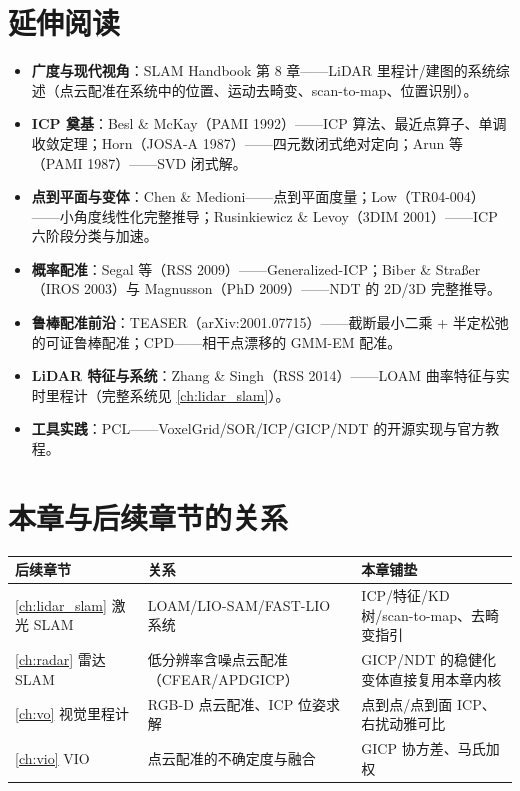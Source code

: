 \section*{延伸阅读}
\begin{itemize}
  \item \textbf{广度与现代视角}：SLAM Handbook\cite{carlone2026handbook} 第 8 章——LiDAR 里程计/建图的系统综述（点云配准在系统中的位置、运动去畸变、scan-to-map、位置识别）。
  \item \textbf{ICP 奠基}：Besl \& McKay\cite{besl1992icp}（PAMI 1992）——ICP 算法、最近点算子、单调收敛定理；Horn\cite{horn1987absolute}（JOSA-A 1987）——四元数闭式绝对定向；Arun 等\cite{arun1987leastsquares}（PAMI 1987）——SVD 闭式解。
  \item \textbf{点到平面与变体}：Chen \& Medioni\cite{chen1992pointplane}——点到平面度量；Low\cite{low2004p2plane}（TR04-004）——小角度线性化完整推导；Rusinkiewicz \& Levoy\cite{rusinkiewicz2001efficient}（3DIM 2001）——ICP 六阶段分类与加速。
  \item \textbf{概率配准}：Segal 等\cite{segal2009gicp}（RSS 2009）——Generalized-ICP；Biber \& Straßer\cite{biber2003ndt}（IROS 2003）与 Magnusson\cite{magnusson2009ndt}（PhD 2009）——NDT 的 2D/3D 完整推导。
  \item \textbf{鲁棒配准前沿}：TEASER\cite{yang2021teaser}（arXiv:2001.07715）——截断最小二乘 + 半定松弛的可证鲁棒配准；CPD\cite{myronenko2010cpd}——相干点漂移的 GMM-EM 配准。
  \item \textbf{LiDAR 特征与系统}：Zhang \& Singh\cite{zhang2014loam}（RSS 2014）——LOAM 曲率特征与实时里程计（完整系统见 \cref{ch:lidar_slam}）。
  \item \textbf{工具实践}：PCL\cite{rusu2011pcl}——VoxelGrid/SOR/ICP/GICP/NDT 的开源实现与官方教程。
\end{itemize}

\section*{本章与后续章节的关系}
\begin{table}[H]\centering\small
\begin{tabular}{lll}
\toprule
后续章节 & 关系 & 本章铺垫 \\
\midrule
\cref{ch:lidar_slam} 激光 SLAM & LOAM/LIO-SAM/FAST-LIO 系统 & ICP/特征/KD 树/scan-to-map、去畸变指引 \\
\cref{ch:radar} 雷达 SLAM & 低分辨率含噪点云配准（CFEAR/APDGICP） & GICP/NDT 的稳健化变体直接复用本章内核 \\
\cref{ch:vo} 视觉里程计 & RGB-D 点云配准、ICP 位姿求解 & 点到点/点到面 ICP、右扰动雅可比 \\
\cref{ch:vio} VIO & 点云配准的不确定度与融合 & GICP 协方差、马氏加权 \\
\bottomrule
\end{tabular}
\end{table}

